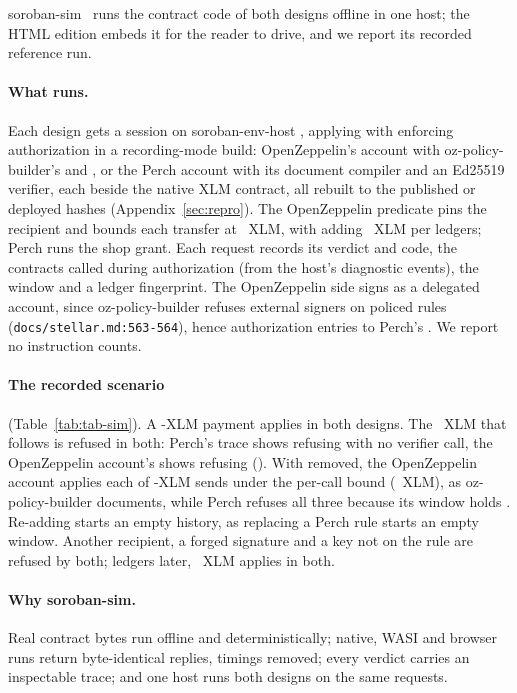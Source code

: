 soroban-sim~ runs the contract code of both designs
offline in one host; the HTML edition embeds it for the reader to drive, and we
report its recorded reference run.

\paragraph{What runs.} Each design gets a session on soroban-env-host
, applying with enforcing authorization in a
recording-mode build: OpenZeppelin's  account with
oz-policy-builder's  and , or the
Perch account with its document compiler and an Ed25519 verifier, each beside
the native XLM contract, all rebuilt to the published or deployed hashes
(Appendix~\ref{sec:repro}). The OpenZeppelin predicate pins the
recipient and bounds each transfer at ~XLM, with
 adding ~XLM per
 ledgers; Perch runs the shop grant. Each request
records its verdict and code, the contracts called during authorization (from
the host's diagnostic events), the window and a ledger fingerprint. The
OpenZeppelin side signs as a delegated account, since oz-policy-builder refuses
external signers on policed rules (\nolinkurl{docs/stellar.md:563-564}), hence
 authorization entries to Perch's .
We report no instruction counts.

\paragraph{The recorded scenario} (Table~\ref{tab:tab-sim}). A -XLM payment applies in both designs. The
~XLM that follows is refused in both: Perch's trace shows 
refusing with no verifier call, the OpenZeppelin account's shows
 refusing (). With
 removed, the OpenZeppelin account applies each of
 -XLM sends under the per-call bound
(~XLM), as oz-policy-builder documents, while
Perch refuses all three because its window holds .
Re-adding  starts an empty history, as replacing
a Perch rule starts an empty window. Another recipient, a forged signature and
a key not on the rule are refused by both;  ledgers
later, ~XLM applies in both.


\paragraph{Why soroban-sim.} Real contract bytes run offline and
deterministically; native, WASI and browser runs return byte-identical replies,
timings removed; every verdict carries an inspectable trace; and one host runs
both designs on the same requests.
